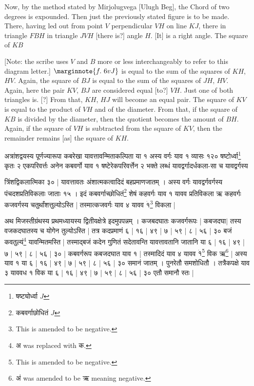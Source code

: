 \documentclass[12pt]{book}
\begin{document}
\newpage

Now, by the method stated by Mirjolugvega [Ulugh Beg], the Chord of two degrees is expounded. 
Then just the previously stated figure is to be made. \\ 

\iffalse
\begin{center}
\texttt{[image: 6r.png]}
\captionof{figure}{6r}
\end{center}
\fi 

There, having led out from point $V$ perpendicular $VH$ on line $KJ$, there in triangle
$FBH$ in triangle $JVH$ [there is?] angle $H$. [It] is a right angle. The square of $KB$ 

[Note: the scribe uses $V$ and $B$ more or less interchangeably to refer to this 
diagram letter.]
$\marginnote{f.~6v J}$
is equal to the sum of the squares of $KH$, $HV$. Again, the square of $BJ$ is equal to the
sum of the squares of $JH$, $HV$. Again, here the pair $KV$, $BJ$ are considered equal 
[to?] $VH$. Just one of both triangles is.  [?] From that, $KH$, $HJ$ will become an equal pair.
The square of $KV$ is equal to the product of $VH$ and of the diameter. From that, if the 
square of $KB$ is divided by the diameter, then the quotient becomes the amount of $BH$.
Again, if the square of $VH$ is subtracted from the square of $KV$, then the remainder
remains [as] the square of $KH$.  


\newpage

{\s अत्रांशद्वयस्य पूर्णज्यारूपा कबरेखा
यावत्तावन्मिताकल्पिता या १ अस्य वर्गः
याव १ व्यासः १२० षष्टोर्ध्वा\footnote{{\s षष्ट्योर्ध्वा} $J$} कृतः २ एकपरिवर्त्तः अनेन कबवर्गो याव १ षष्टेरेकपरिवर्त्तेन २ भक्ते लब्धं
यावद्वर्गादर्धकला-सा च यावद्वर्गस्य 

त्रिंशद्विकलात्मिका ३० | 
यावत्तावतः अंशात्मकत्वादिदं बहप्रमाणजातम् । अस्य वर्गः यावद्वर्गवर्गस्य
पंचदशप्रतिविकलाः जाताः १५ । इदं कबवर्गाच्छोधितं\footnote{{\s कबवर्गाछोधितं} $J$} शेषं कहवर्गः याव १ यावव प्रतिविकला ऋ कहवर्गः कजवर्गस्य चतुर्थांशत्तुल्योऽस्ति |  तस्मात्कजवर्गः याव ४ यावव $\dot{१}$\footnote{This is amended to be negative.}
विकला |

अथ मिजस्तीग्रंथस्य प्रथमध्यायस्य द्वितीयक्षेत्रे इदमुपपन्नम् । कजबदघातः कजवर्गरूपः |
कबजदघा$|$
तस्य वजकदघातस्य च योगेन तुल्योऽस्ति | तत्र कदप्रमाणं ६ | १६ | ४९ | ७ | ५९ | ८ | ५६ | ३० बजं कवतुल्यं\footnote{{\s अ} was replaced with {\s क}.}
यावन्मितमस्ति | तस्माद्बजं कदेन गुणितं सदेतावन्ति यावत्तावतानि जातानि या ६ | १६ | ४९ | ७ | ५९ | ८ | ५६ | ३० | कबवर्गरूप कबजदघात याव १ |
तस्मादिदं याव ४ यावव $\dot{१}$\footnote{This is amended to be negative.} विक ऋ\footnote{{\s अं} was amended to be {\s ऋ} meaning negative.} | अस्य याव १ या ६ | १६ | ४९ | ७ | ५९ | ८ | ५६ | ३० समानं जातम् । पुनरेतौ समशोधितौ । तत्रैकपक्षे
याव ३ याववध १ विक 
या ६ | १६ | ४९ | ७ | ५९ | ८ | ५६ | ३० एतौ समानौ स्तः |} 
\end{document}
